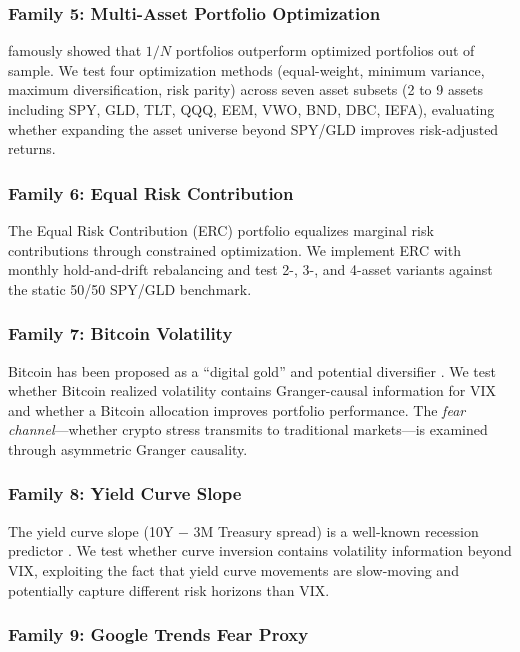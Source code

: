 \documentclass[12pt,a4paper]{article}
\begin{document}
\subsubsection{Family 5: Multi-Asset Portfolio Optimization}

\citet{demiguel2009} famously showed that $1/N$ portfolios outperform optimized portfolios out of sample. We test four optimization methods (equal-weight, minimum variance, maximum diversification, risk parity) across seven asset subsets (2 to 9 assets including SPY, GLD, TLT, QQQ, EEM, VWO, BND, DBC, IEFA), evaluating whether expanding the asset universe beyond SPY/GLD improves risk-adjusted returns.

\subsubsection{Family 6: Equal Risk Contribution}

The Equal Risk Contribution (ERC) portfolio \citep{maillard2010} equalizes marginal risk contributions through constrained optimization. We implement ERC with monthly hold-and-drift rebalancing and test 2-, 3-, and 4-asset variants against the static 50/50 SPY/GLD benchmark.

\subsubsection{Family 7: Bitcoin Volatility}

Bitcoin has been proposed as a ``digital gold'' and potential diversifier \citep{bouri2017}. We test whether Bitcoin realized volatility contains Granger-causal information for VIX and whether a Bitcoin allocation improves portfolio performance. The \emph{fear channel}---whether crypto stress transmits to traditional markets---is examined through asymmetric Granger causality.

\subsubsection{Family 8: Yield Curve Slope}

The yield curve slope (10Y $-$ 3M Treasury spread) is a well-known recession predictor \citep{estrella1998}. We test whether curve inversion contains volatility information beyond VIX, exploiting the fact that yield curve movements are slow-moving and potentially capture different risk horizons than VIX.

\subsubsection{Family 9: Google Trends Fear Proxy}
\end{document}
